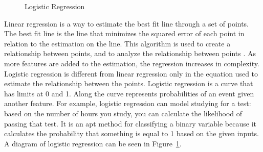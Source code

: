 \documentclass[midd]{thesis}
\begin{document}
\begin{figure}

\caption{Logistic Regression}
\label{fig:lr}
\end{figure}

Linear regression is a way to estimate the best fit line through a set of points. The best fit line is the line that minimizes the squared error of each point in relation to the estimation on the line. This algorithm is used to create a relationship between points, and to analyze the relationship between points \cite{Swaminathan}. As more features are added to the estimation, the regression increases in complexity. Logistic regression is different from linear regression only in the equation used to estimate the relationship between the points. Logistic regression is a curve that has limits at 0 and 1. Along the curve represents probabilities of an event given another feature. For example, logistic regression can model studying for a test: based on the number of hours you study, you can calculate the likelihood of passing that test. It is an apt method for classifying a binary variable because it calculates the probability that something is equal to 1 based on the given inputs. A diagram of logistic regression can be seen in Figure~\ref{fig:lr}.
\end{document}
